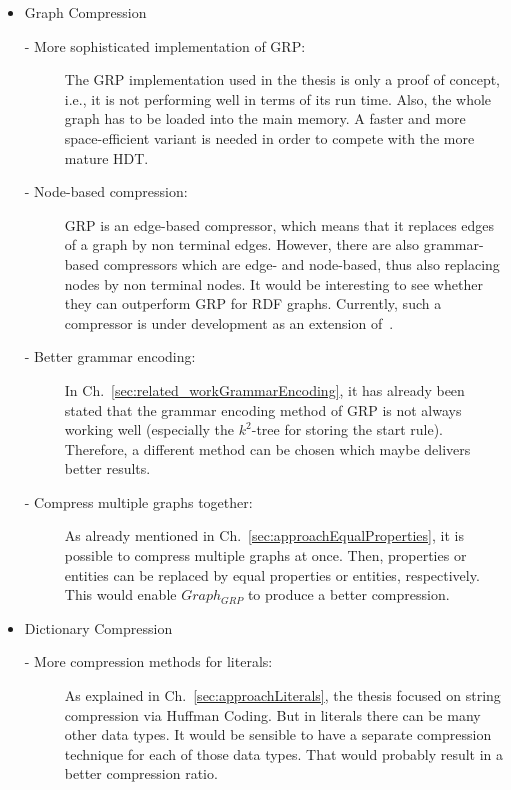 \begin{itemize}
	\item Graph Compression
	\begin{description}
		\item [- More sophisticated implementation of GRP:] The GRP implementation used in the thesis is only a proof of concept, i.e., it is not performing well in terms of its run time. Also, the whole graph has to be loaded into the main memory. A faster and more space-efficient variant is needed in order to compete with the more mature HDT.
		\item [- Node-based compression:] GRP is an edge-based compressor, which means that it replaces edges of a graph by non terminal edges. However, there are also grammar-based compressors which are edge- and node-based, thus also replacing nodes by non terminal nodes. It would be interesting to see whether they can outperform GRP for RDF graphs. Currently, such a compressor is under development as an extension of~\cite{mattdk}.
		\item [- Better grammar encoding:] In Ch.~\ref{sec:related_workGrammarEncoding}, it has already been stated that the grammar encoding method of GRP is not always working well (especially the $k^2$-tree for storing the start rule). Therefore, a different method can be chosen which maybe delivers better results.
		\item [- Compress multiple graphs together:] As already mentioned in Ch.~\ref{sec:approachEqualProperties}, it is possible to compress multiple graphs at once. Then, properties or entities can be replaced by equal properties or entities, respectively. This would enable $Graph_{GRP}$ to produce a better compression.
	\end{description}
	\item Dictionary Compression
	\begin{description}
		\item [- More compression methods for literals:] As explained in Ch.~\ref{sec:approachLiterals}, the thesis focused on string compression via Huffman Coding. But in literals there can be many other data types. It would be sensible to have a separate compression technique for each of those data types. That would probably result in a better compression ratio.
	\end{description}
\end{itemize}


